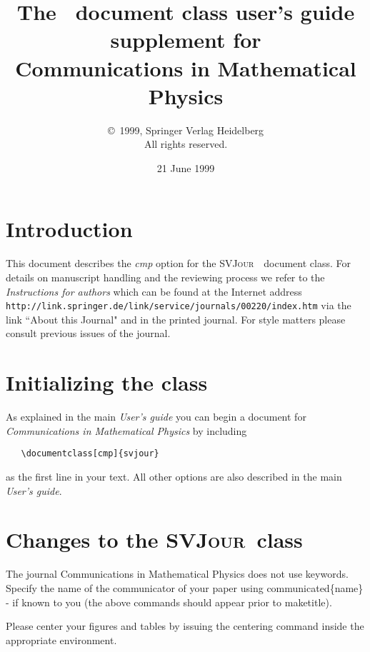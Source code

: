 \documentclass{ltxguide}[1995/11/28]
\title{The \SJour\ document class user's guide\\supplement
for\\Communications in Mathematical Physics}
\author{\copyright~1999, Springer Verlag Heidelberg\\
   All rights reserved.}
\date{21 June 1999}
\newcommand{\SJour}{\textsc{SVJour}}
\newcommand{\command}[1]{{\ttfamily\upshape\char92#1}}
\begin{document}
\maketitle

\section{Introduction}
\label{sec:intro}
This document describes the \textit{cmp} option for the \SJour\
\LaTeXe\ document class. For details on manuscript handling and the
reviewing process we refer to the \emph{Instructions for authors} which
can be found at the Internet address
\texttt{http://link.springer.de/link/service/journals/00220/index.htm}
via the link ``About this Journal" and in the printed journal. For style
matters please consult previous issues of the journal.

\section{Initializing the class} \label{sec:opt}

As explained in the main \emph{User's guide} you can begin a document
for \emph{Communications in Mathematical Physics} by including
\begin{verbatim}
   \documentclass[cmp]{svjour}
\end{verbatim}
as the first line in your text. All other options are also described
in the main \emph{User's guide}.

\section{Changes to the \SJour\ class}
The journal Communications in Mathematical Physics does not use
keywords. Specify the name of the communicator of your paper using
\command{communicated\{name\}} - if known to you (the above commands
should appear prior to \command{maketitle}).

Please center your figures and tables by issuing the
\command{centering} command inside the appropriate environment.
\end{document}
